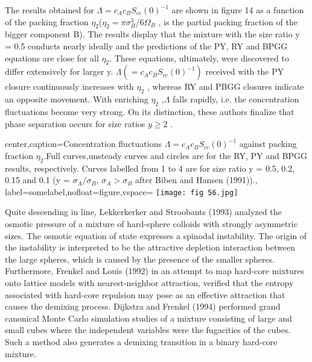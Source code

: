 \documentclass[12pt]{article}
\newcommand*{\1}{\hspace{1pt}}
\begin{document}
        The results obtained for $\Lambda = c_{A}c_{B}{S_{cc}(0)}^{-1}$ are shown in figure 14 as a function of the
    packing fraction $\eta_{2} $($\eta_{2} = \pi \sigma^{3}_{B}/6\Omega _{B}$ , is the partial 
    packing fraction of the bigger component
    B). The results display that the mixture with the size ratio y = 0.5 conducts nearly ideally
    and the predictions of the PY, RY and BPGG equations are close for all $\eta_2$. These equations,
    ultimately, were discovered to differ extensively for larger y. $\Lambda (= c_{A}c_{B}{S_{cc}(0)}^{-1})$  received with
    the PY closure continuously increases with $\eta_2$ , whereas RY and PBGG closures indicate an opposite
    movement. With enriching $\eta_2$ ,$\Lambda $ falls rapidly, i.e. the concentration fluctuations 
    become very strong. On its distinction, these authors finalize that phase separation occurs for size 
    ratios $y \geq 2$ .
    \begin{adjustbox}{center,caption={Concentration fluctuations $\Lambda = c_{A}c_{B}{S_{cc}(0)}^{-1}$ 
        against packing fraction $\eta_2$.Full curves,unsteady curves and circles are for the RY, 
        PY and BPGG results, respectively. 
        Curves labelled from 1 to 4 are for size ratio y = 0.5, 0.2, 0.15 and 0.1 (y = 
        $\sigma_{A}/\sigma_{B}$, $\sigma_{A} > \sigma_{B}$ after Biben and
        Hansen (1991)).},
        label={somelabel},nofloat=figure,vspace=\bigskipamount}
        \texttt{[image: fig 56.jpg]}
    \end{adjustbox}
        Quite descending in line, Lekkerkerker and Stroobants (1993) analyzed the osmotic pressure
    of a mixture of hard-sphere colloids with strongly asymmetric sizes. The osmotic equation
    of state expresses a spinodal instability. The origin of the instability is interpreted to be the
    attractive depletion interaction between the large spheres, which is caused by the presence
    of the smaller spheres.\\
        Furthermore, Frenkel and Louis (1992) in an attempt to map hard-core mixtures onto
    lattice models with nearest-neighbor attraction, verified that the entropy associated
    with hard-core repulsion may pose as an effective attraction that causes the demixing process.
    Dijkstra and Frenkel (1994) performed grand canonical Monte Carlo simulation studies of
    a mixture consisting of large and small cubes where the independent variables were the
    fugacities of the cubes. Such a method also generates a demixing transition in a binary
    hard-core mixture.\\
\end{document}
